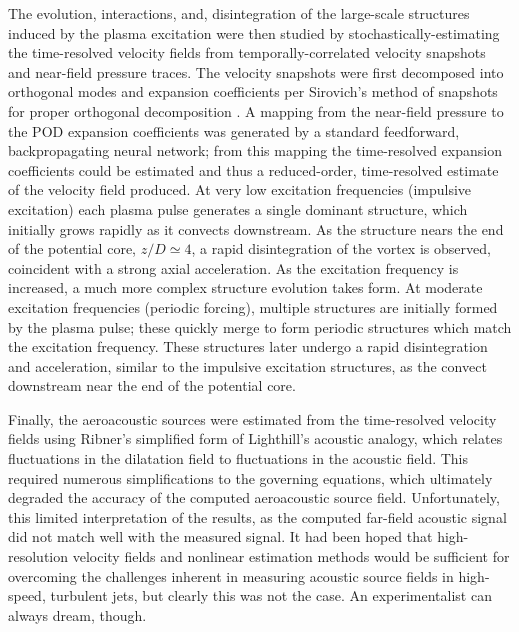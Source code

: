 The evolution, interactions, and, disintegration of the large-scale structures induced by the plasma excitation were then studied by stochastically-estimating the time-resolved velocity fields from temporally-correlated velocity snapshots and near-field pressure traces.
The velocity snapshots were first decomposed into orthogonal modes and expansion coefficients per Sirovich's method of snapshots for proper orthogonal decomposition \citep{Sirovich1987}.
A mapping from the near-field pressure to the POD expansion coefficients was generated by a standard feedforward, backpropagating neural network; from this mapping the time-resolved expansion coefficients could be estimated and thus a reduced-order, time-resolved estimate of the velocity field produced.
At very low excitation frequencies (impulsive excitation) each plasma pulse generates a single dominant structure, which initially grows rapidly as it convects downstream. 
As the structure nears the end of the potential core, $z/D \simeq 4$, a rapid disintegration of the vortex is observed, coincident with a strong axial acceleration.
As the excitation frequency is increased, a much more complex structure evolution takes form.
At moderate excitation frequencies (periodic forcing), multiple structures are initially formed by the plasma pulse; these quickly merge to form periodic structures which match the excitation frequency.
These structures later undergo a rapid disintegration and acceleration, similar to the impulsive excitation structures, as the convect downstream near the end of the potential core. 

Finally, the aeroacoustic sources were estimated from the time-resolved velocity fields using Ribner's simplified form of Lighthill's acoustic analogy, which relates fluctuations in the dilatation field to fluctuations in the acoustic field.
This required numerous simplifications to the governing equations, which ultimately degraded the accuracy of the computed aeroacoustic source field.
Unfortunately, this limited interpretation of the results, as the computed far-field acoustic signal did not match well with the measured signal.
It had been hoped that high-resolution velocity fields and nonlinear estimation methods would be sufficient for overcoming the challenges inherent in measuring acoustic source fields in high-speed, turbulent jets, but clearly this was not the case. 
An experimentalist can always dream, though.


